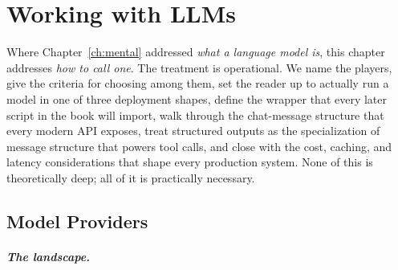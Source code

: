 
\chapter{Working with LLMs}
\label{ch:working}


Where Chapter~\ref{ch:mental} addressed \emph{what a language model
is}, this chapter addresses \emph{how to call one}. The treatment
is operational. We name the players, give the criteria for choosing
among them, set the reader up to actually run a model in one of
three deployment shapes, define the  wrapper that
every later script in the book will import, walk through the
chat-message structure that every modern API exposes, treat
structured outputs as the specialization of message structure that
powers tool calls, and close with the cost, caching, and latency
considerations that shape every production system. None of this is
theoretically deep; all of it is practically necessary.

\section{Model Providers}
\label{sec:work-providers}


\paragraph{The landscape.}

